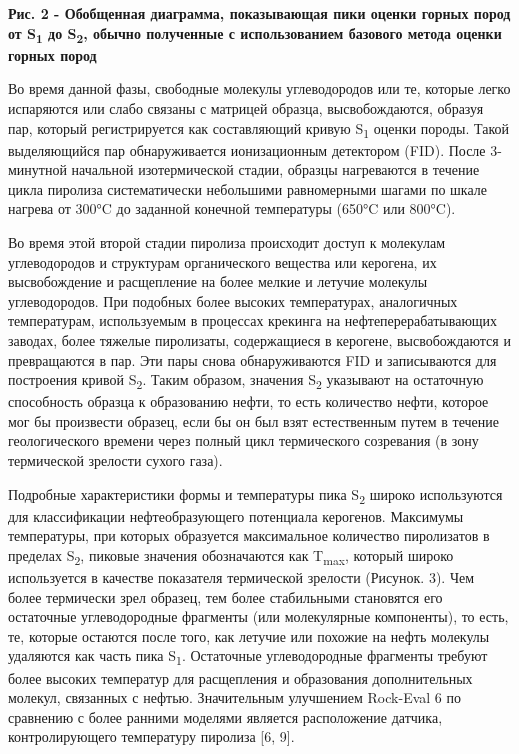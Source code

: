 {\bfseries Рис. 2 - Обобщенная диаграмма, показывающая пики оценки горных
пород от S\textsubscript{1} до S\textsubscript{2}, обычно полученные с
использованием базового метода оценки горных пород}

Во время данной фазы, свободные молекулы углеводородов или те, которые
легко испаряются или слабо связаны с матрицей образца, высвобождаются,
образуя пар, который регистрируется как составляющий кривую
S\textsubscript{1} оценки породы. Такой выделяющийся пар обнаруживается
ионизационным детектором (FID). После 3-минутной начальной
изотермической стадии, образцы нагреваются в течение цикла пиролиза
систематически небольшими равномерными шагами по шкале нагрева от 300°C
до заданной конечной температуры (650°C или 800°C).

Во время этой второй стадии пиролиза происходит доступ к молекулам
углеводородов и структурам органического вещества или керогена, их
высвобождение и расщепление на более мелкие и летучие молекулы
углеводородов. При подобных более высоких температурах, аналогичных
температурам, используемым в процессах крекинга на нефтеперерабатывающих
заводах, более тяжелые пиролизаты, содержащиеся в керогене,
высвобождаются и превращаются в пар. Эти пары снова обнаруживаются FID и
записываются для построения кривой S\textsubscript{2}. Таким образом,
значения S\textsubscript{2} указывают на остаточную способность образца
к образованию нефти, то есть количество нефти, которое мог бы произвести
образец, если бы он был взят естественным путем в течение геологического
времени через полный цикл термического созревания (в зону термической
зрелости сухого газа).

Подробные характеристики формы и температуры пика S\textsubscript{2}
широко используются для классификации нефтеобразующего потенциала
керогенов. Максимумы температуры, при которых образуется максимальное
количество пиролизатов в пределах S\textsubscript{2}, пиковые значения
обозначаются как T\textsubscript{max}, который широко используется в
качестве показателя термической зрелости (Рисунок. 3). Чем более
термически зрел образец, тем более стабильными становятся его остаточные
углеводородные фрагменты (или молекулярные компоненты), то есть, те,
которые остаются после того, как летучие или похожие на нефть молекулы
удаляются как часть пика S\textsubscript{1}. Остаточные углеводородные
фрагменты требуют более высоких температур для расщепления и образования
дополнительных молекул, связанных с нефтью. Значительным улучшением
Rock-Eval 6 по сравнению с более ранними моделями является расположение
датчика, контролирующего температуру пиролиза {[}6, 9{]}.

